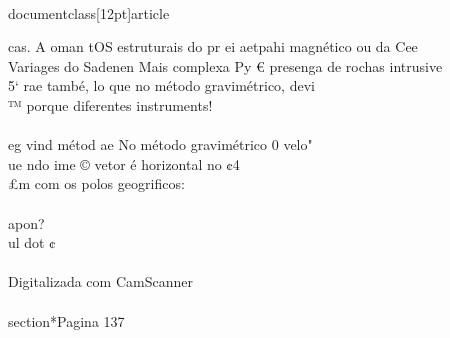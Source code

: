 \\documentclass[12pt]{article}
\begin{document}
cas. A oman tOS estruturais do pr ei aetpahi magnético ou da Cee\\
Variages do Sadenen Mais complexa Py € presenga de rochas intrusive\\
5‘ rae també, lo que no método gravimétrico, devi\\
™ porque diferentes instruments!\\
\\
eg vind métod ae No método gravimétrico 0 velo"\\
ue ndo ime © vetor é horizontal no ¢4\\
£m com os polos geogrificos:\\
\\
apon?\\
ul dot ¢\\
\\
Digitalizada com CamScanner\\

\\section*{Pagina 137}
\end{document}
